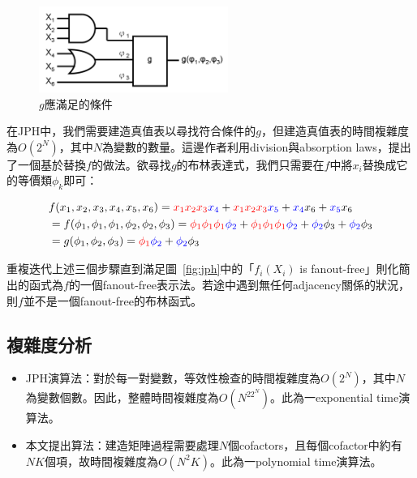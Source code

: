 \documentclass[
  12pt,
  paper=a4,
  ,captions=tableheading
]{scrartcl}
\begin{document}
\begin{enumerate}
  \begin{figure}
  \centering
  \includegraphics[width=0.55\textwidth,height=\textheight]{./resources/factor.png}
  \caption{\(g\)應滿足的條件}
  \end{figure}

  在JPH中，我們需要建造真值表以尋找符合條件的\(g\)，但建造真值表的時間複雜度為\(O(2^N)\)，其中\(N\)為變數的數量。這邊作者利用division與absorption
  laws，提出了一個基於替換\(f\)的做法。欲尋找\(g\)的布林表達式，我們只需要在\(f\)中將\(x_i\)替換成它的等價類\(\phi_k\)即可：

  \[\begin{aligned}
  &{} f(x_1, x_2, x_3, x_4, x_5, x_6) = \textcolor{red}{x_1x_2x_3}\textcolor{blue}{x_4}+\textcolor{red}{x_1x_2x_3}\textcolor{blue}{x_5}+\textcolor{blue}{x_4}x_6+\textcolor{blue}{x_5}x_6\\
  & = f(\phi_1, \phi_1, \phi_1, \phi_2, \phi_2, \phi_3) = \textcolor{red}{\phi_1\phi_1\phi_1}\textcolor{blue}{\phi_2}+\textcolor{red}{\phi_1\phi_1\phi_1}\textcolor{blue}{\phi_2}+\textcolor{blue}{\phi_2}\phi_3+\textcolor{blue}{\phi_2}\phi_3\\
  & = g(\phi_1, \phi_2, \phi_3) = \textcolor{red}{\phi_1}\textcolor{blue}{\phi_2} + \textcolor{blue}{\phi_2}\phi_3
  \end{aligned}\]
\end{enumerate}

重複迭代上述三個步驟直到滿足圖~\ref{fig:jph}中的「\(f_i(X_i)\) is
fanout-free」則化簡出的函式為\(f\)的一個fanout-free表示法。若途中遇到無任何adjacency關係的狀況，則\(f\)並不是一個fanout-free的布林函式。

\hypertarget{ux8907ux96dcux5ea6ux5206ux6790}{%
\subsection{複雜度分析}\label{ux8907ux96dcux5ea6ux5206ux6790}}

\begin{itemize}
\item
  JPH演算法：對於每一對變數，等效性檢查的時間複雜度為\(O(2^N)\)，其中\(N\)為變數個數。因此，整體時間複雜度為\(O(N^22^N)\)。此為一exponential
  time演算法。
\item
  本文提出算法：建造矩陣過程需要處理\(N\)個cofactors，且每個cofactor中約有\(NK\)個項，故時間複雜度為\(O(N^2K)\)。此為一polynomial
  time演算法。
\end{itemize}
\end{document}
